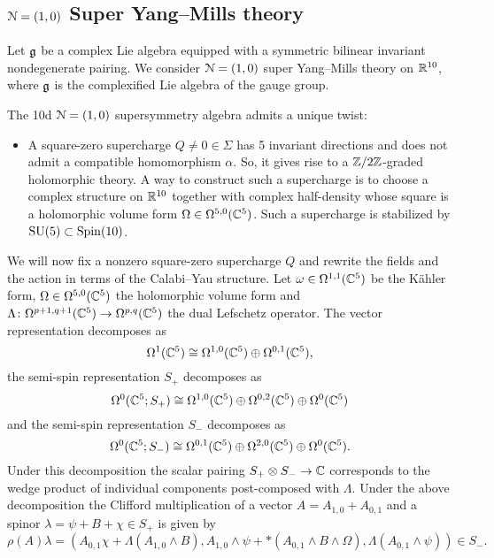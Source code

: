 \documentclass[10pt, oneside]{article}
\begin{document}
\subsection{\texorpdfstring{$\mathcal N=(1, 0)$}{N=(1,0)} Super Yang--Mills theory}

Let $\mathfrak g$ be a complex Lie algebra equipped with a symmetric bilinear invariant nondegenerate pairing. We consider $\mathcal N=(1, 0)$ super Yang--Mills theory on $\mathbb R^{10}$, where $\mathfrak g$ is the complexified Lie algebra of the gauge group.

The 10d $\mathcal N=(1, 0)$ supersymmetry algebra admits a unique twist:
\begin{itemize}
\item A square-zero supercharge $Q\neq 0\in\Sigma$ has 5 invariant directions and does not admit a compatible homomorphism $\alpha$. So, it gives rise to a $\mathbb Z/2\mathbb Z$-graded holomorphic theory. A way to construct such a supercharge is to choose a complex structure on $\mathbb R^{10}$ together with complex half-density whose square is a holomorphic volume form $\Omega\in\Omega^{5, 0}(\mathbb C^5)$. Such a supercharge is stabilized by $\mathrm{SU}(5)\subset \mathrm{Spin}(10)$.
\end{itemize}

We will now fix a nonzero square-zero supercharge $Q$ and rewrite the fields and the action in terms of the Calabi--Yau structure. Let $\omega\in\Omega^{1, 1}(\mathbb C^5)$ be the K\"ahler form, $\Omega\in\Omega^{5, 0}(\mathbb C^5)$ the holomorphic volume form and $\Lambda\colon \Omega^{p+1, q+1}(\mathbb C^5)\rightarrow \Omega^{p, q}(\mathbb C^5)$ the dual Lefschetz operator. The vector representation decomposes as
\[\Omega^1(\mathbb C^5)\cong \Omega^{1, 0}(\mathbb C^5)\oplus \Omega^{0, 1}(\mathbb C^5),\]
the semi-spin representation $S_+$ decomposes as
\[\Omega^0(\mathbb C^5; S_+)\cong \Omega^{1, 0}(\mathbb C^5)\oplus \Omega^{0, 2}(\mathbb C^5)\oplus \Omega^0(\mathbb C^5)\]
and the semi-spin representation $S_-$ decomposes as
\[\Omega^0(\mathbb C^5; S_-)\cong \Omega^{0, 1}(\mathbb C^5)\oplus \Omega^{2, 0}(\mathbb C^5)\oplus \Omega^0(\mathbb C^5).\]
Under this decomposition the scalar pairing $S_+\otimes S_-\rightarrow \mathbb C$ corresponds to the wedge product of individual components post-composed with $\Lambda$. Under the above decomposition the Clifford multiplication of a vector $A = A_{1, 0} + A_{0, 1}$ and a spinor $\lambda = \psi + B + \chi\in S_+$ is given by
\[\rho(A)\lambda = (A_{0, 1}\chi + \Lambda(A_{1, 0}\wedge B), A_{1, 0}\wedge \psi + \ast(A_{0, 1}\wedge B\wedge\Omega), \Lambda(A_{0, 1}\wedge \psi))\in S_-.\]

\vspace{-10pt}
\end{document}
